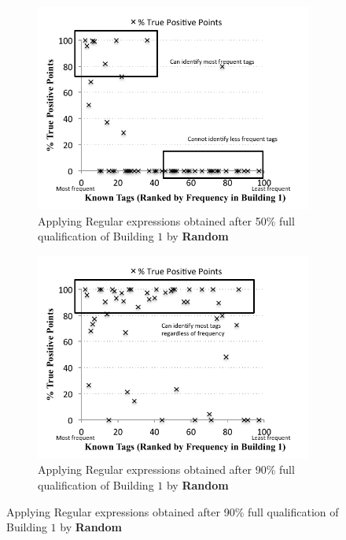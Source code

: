 \begin{figure}[ht!]
\centering
	\begin{subfigure}{0.4\textwidth}
                \centering
		\includegraphics[width=\textwidth]{./figs/recallCampusWide-point-50.pdf}
                \caption{Applying Regular expressions obtained after 50\% full qualification of Building $1$ by {\bf Random}}
		\label{fig:point50}
	\end{subfigure}
	\begin{subfigure}{0.4\textwidth}
                \centering
		\includegraphics[width=\textwidth]{./figs/recallCampusWide-point-90.pdf}
                \caption{Applying Regular expressions obtained after 90\% full qualification of Building $1$ by {\bf Random}}

\end{subfigure}
\end{figure}
